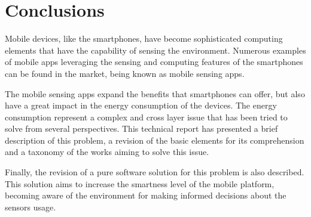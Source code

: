 \section{Conclusions}
\label{sec:conclusions}
Mobile devices, like the smartphones, have become sophisticated computing elements that have the capability of sensing the environment. 
Numerous examples of mobile apps leveraging the sensing and computing features of the smartphones can be found in the market, being known as mobile sensing apps.

The mobile sensing apps expand the benefits that smartphones can offer, but also have a great impact in the energy consumption of the devices.
The energy consumption represent a complex and cross layer issue that has been tried to solve from several perspectives.
This technical report has presented a brief description of this problem, a revision of the basic elements for its comprehension and a taxonomy of the works aiming to solve this issue.

Finally, the revision of a pure software solution for this problem is also described.
This solution aims to increase the smartness level of the mobile platform, becoming aware of the environment for making informed decisions about the sensors usage.
